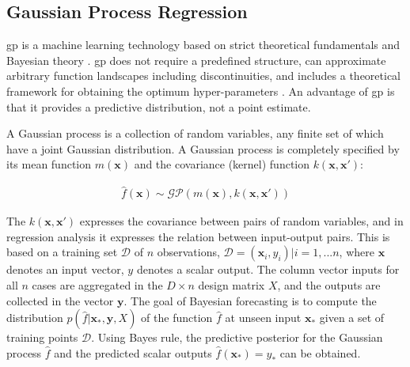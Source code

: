 \documentclass[12pt, runningheads,a4paper]{llncs}
\begin{document}

\subsection{Gaussian Process Regression}

\ac{gp} is a machine learning technology based on strict theoretical fundamentals and Bayesian theory \cite{Seeger04gaussianprocesses,Rasmussen06gaussianprocesses}. \ac{gp} does not require a predefined structure, can approximate arbitrary function landscapes including discontinuities, and includes a theoretical framework for obtaining the optimum hyper-parameters \cite{5194095}. An advantage of \ac{gp} is that it provides a predictive distribution, not a point estimate.


A Gaussian process is a collection of random variables, any finite set of which have a joint Gaussian distribution. A Gaussian process is completely specified by its mean function $m(\mathbf{x})$ and the covariance (kernel) function $k(\mathbf{x},\mathbf{x'})$:



\begin{align} 
\hat{f}(\mathbf{x}) \sim \mathcal{G}\mathcal{P}(m(\mathbf{x}),k(\mathbf{x},\mathbf{x'}))
\end{align}


The $k(\mathbf{x},\mathbf{x'})$ expresses the covariance between pairs of random variables, and in regression analysis it expresses the relation between input-output pairs. This is based on a training set $\mathcal{D}$ of $n$ observations, $\mathcal{D}={(\mathbf{x}_i,y_{i}) | i = 1, ... n} $, where $\mathbf{x}$ denotes an input vector, $y$ denotes a scalar output. The column vector inputs for all $n$ cases are aggregated in the $D \times n$ design matrix $X$, and the outputs are collected in the vector $\mathbf{y}$. The goal of Bayesian forecasting is to compute the distribution $p(\hat{f}|\mathbf{x_*},\mathbf{y},X)$ of the function $\hat{f}$ at unseen input $\mathbf{x_{*}}$ given a set of training points $\mathcal{D}$. Using Bayes rule, the predictive posterior for the Gaussian process $\hat{f}$ and the predicted scalar outputs $\hat{f}(\mathbf{x_*})=y_*$ can be obtained.

\end{document}

